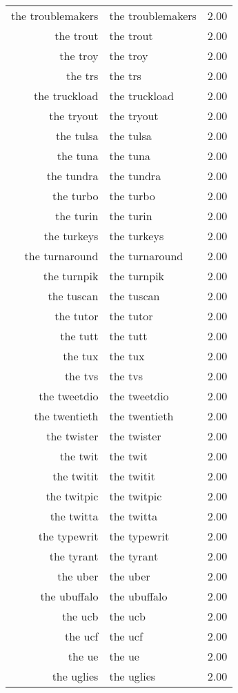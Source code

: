 \begin{table}[ht]
\begin{tabular}{rlr}
  the troublemakers & the troublemakers & 2.00 \\ 
  the trout & the trout & 2.00 \\ 
  the troy & the troy & 2.00 \\ 
  the trs & the trs & 2.00 \\ 
  the truckload & the truckload & 2.00 \\ 
  the tryout & the tryout & 2.00 \\ 
  the tulsa & the tulsa & 2.00 \\ 
  the tuna & the tuna & 2.00 \\ 
  the tundra & the tundra & 2.00 \\ 
  the turbo & the turbo & 2.00 \\ 
  the turin & the turin & 2.00 \\ 
  the turkeys & the turkeys & 2.00 \\ 
  the turnaround & the turnaround & 2.00 \\ 
  the turnpik & the turnpik & 2.00 \\ 
  the tuscan & the tuscan & 2.00 \\ 
  the tutor & the tutor & 2.00 \\ 
  the tutt & the tutt & 2.00 \\ 
  the tux & the tux & 2.00 \\ 
  the tvs & the tvs & 2.00 \\ 
  the tweetdio & the tweetdio & 2.00 \\ 
  the twentieth & the twentieth & 2.00 \\ 
  the twister & the twister & 2.00 \\ 
  the twit & the twit & 2.00 \\ 
  the twitit & the twitit & 2.00 \\ 
  the twitpic & the twitpic & 2.00 \\ 
  the twitta & the twitta & 2.00 \\ 
  the typewrit & the typewrit & 2.00 \\ 
  the tyrant & the tyrant & 2.00 \\ 
  the uber & the uber & 2.00 \\ 
  the ubuffalo & the ubuffalo & 2.00 \\ 
  the ucb & the ucb & 2.00 \\ 
  the ucf & the ucf & 2.00 \\ 
  the ue & the ue & 2.00 \\ 
  the uglies & the uglies & 2.00 \\ 

\end{tabular}
\end{table}
